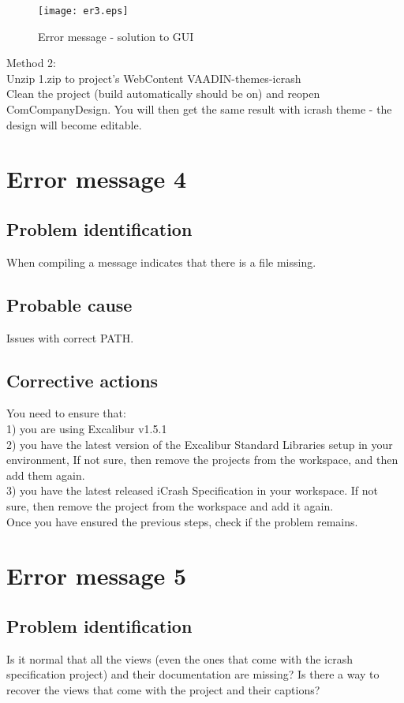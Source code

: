 \begin{figure}
\begin{center}
\texttt{[image: er3.eps]}
\end{center}
\caption{Error message - solution to GUI}
\end{figure}

Method 2:\\
Unzip 1.zip to project's WebContent VAADIN-themes-icrash\\
Clean the project (build automatically should be on) and reopen ComCompanyDesign.
You will then get the same result with icrash theme - the design will become editable.


\section{Error message 4}

\subsection{Problem identification}
When compiling a message indicates that there is a file missing.

\subsection{Probable cause}
Issues with correct PATH.

\subsection{Corrective actions}
You need to ensure that:\\
1) you are using Excalibur v1.5.1\\
2) you have the latest version of the Excalibur Standard Libraries setup in your
environment, If not sure, then remove the projects from the workspace, and then
add them again.\\ 3) you have the latest released iCrash Specification in your
workspace. If not sure, then remove the project from the workspace and add it
again. \\
Once you have ensured the previous steps, check if the problem remains.


\section{Error message 5}

\subsection{Problem identification}
Is it normal that all the views (even the ones that come with the icrash
specification project) and their documentation are missing? Is there a way to recover the views that come with the project and their captions?


